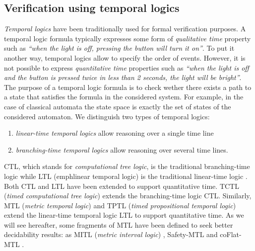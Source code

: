
\subsection{Verification using temporal logics}



\emph{Temporal logics} have been traditionally used for formal verification purposes. A temporal logic formula typically expresses some form of \emph{qualitative time} property such as \emph{``when the light is off, pressing the button will turn it on''}. To put it another way, temporal logics allow to specify the order of events. However, it is not possible to express \emph{quantitative time} properties such as \emph{``when the light is off and the button is pressed twice in less than 2 seconds, the light will be bright''}.\\

The purpose of a temporal logic formula is to check wether there exists a path to a state that satisfies the formula in the considered system. For example, in the case of classical automata the state space is exactly the set of states of the considered automaton. We distinguish two types of temporal logics:
\begin{enumerate}
  
  \item \emph{linear-time temporal logics} allow reasoning over a single time line
  
  \item \emph{branching-time temporal logics} allow reasoning over several time lines.
  
\end{enumerate}
CTL, which stands for \emph{computational tree logic}, is the traditional branching-time logic \cite{ClarkeES86} while LTL (emph{linear temporal logic}) is the traditional linear-time logic \cite{Pnueli77}.\\

Both CTL and LTL have been extended to support quantitative time. TCTL (\emph{timed computational tree logic}) \cite{HNSY94} extends the branching-time logic CTL. Similarly, MTL (\emph{metric temporal logic}) \cite{Koymans90} and TPTL (\emph{timed propositional temporal logic}) \cite{AlurH89,AlurH94} extend the linear-time temporal logic LTL to support quantitative time. As we will see hereafter, some fragments of MTL have been defined to seek better decidability results: as MITL (\emph{metric interval logic}) \cite{AlurFH96}, Safety-MTL \cite{OuaknineW05} and coFlat-MTL \cite{BouyerMOW07}. \\

